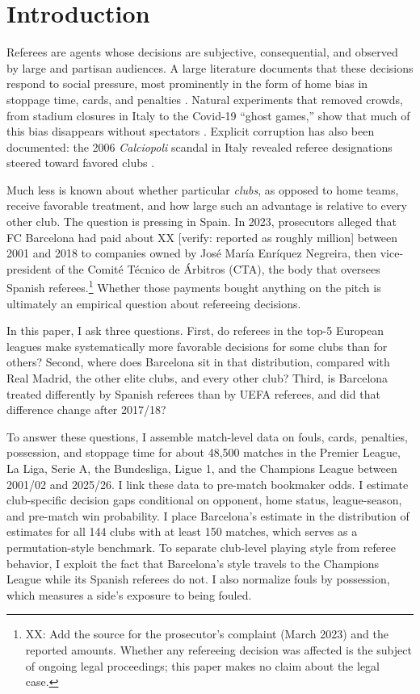 \section{Introduction}\label{sec:intro}

Referees are agents whose decisions are subjective, consequential, and observed by large and partisan audiences. A large literature documents that these decisions respond to social pressure, most prominently in the form of home bias in stoppage time, cards, and penalties \citep{sutter2004favoritism, garicano2005favoritism, boyko2007referee, dohmen2008influence, rickman2008favouritism, scoppa2008subjective, buraimo2010twelfth}. Natural experiments that removed crowds, from stadium closures in Italy to the Covid-19 ``ghost games,'' show that much of this bias disappears without spectators \citep{pettersson2010behavior, endrich2020home, bryson2021causal, reade2022eliminating}. Explicit corruption has also been documented: the 2006 \textit{Calciopoli} scandal in Italy revealed referee designations steered toward favored clubs \citep{boeri2011match}.

Much less is known about whether particular \emph{clubs}, as opposed to home teams, receive favorable treatment, and how large such an advantage is relative to every other club. The question is pressing in Spain. In 2023, prosecutors alleged that FC Barcelona had paid about XX [verify: reported as roughly  million] between 2001 and 2018 to companies owned by José María Enríquez Negreira, then vice-president of the Comité Técnico de Árbitros (CTA), the body that oversees Spanish referees.\footnote{XX: Add the source for the prosecutor's complaint (March 2023) and the reported amounts. Whether any refereeing decision was affected is the subject of ongoing legal proceedings; this paper makes no claim about the legal case.} Whether those payments bought anything on the pitch is ultimately an empirical question about refereeing decisions.

In this paper, I ask three questions. First, do referees in the top-5 European leagues make systematically more favorable decisions for some clubs than for others? Second, where does Barcelona sit in that distribution, compared with Real Madrid, the other elite clubs, and every other club? Third, is Barcelona treated differently by Spanish referees than by UEFA referees, and did that difference change after 2017/18?

To answer these questions, I assemble match-level data on fouls, cards, penalties, possession, and stoppage time for about 48,500 matches in the Premier League, La Liga, Serie A, the Bundesliga, Ligue 1, and the Champions League between 2001/02 and 2025/26. I link these data to pre-match bookmaker odds. I estimate club-specific decision gaps conditional on opponent, home status, league-season, and pre-match win probability. I place Barcelona's estimate in the distribution of estimates for all 144 clubs with at least 150 matches, which serves as a permutation-style benchmark. To separate club-level playing style from referee behavior, I exploit the fact that Barcelona's style travels to the Champions League while its Spanish referees do not. I also normalize fouls by possession, which measures a side's exposure to being fouled.

